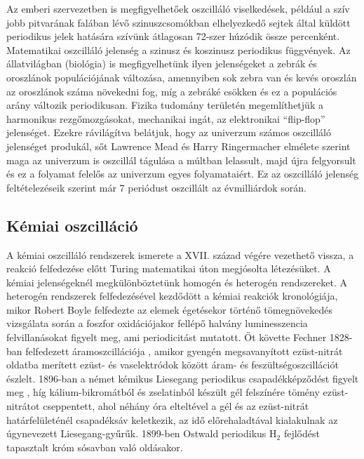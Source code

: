 Az emberi szervezetben is megfigyelhetőek oszcilláló viselkedések, például a szív jobb pitvarának falában lévő szinuszcsomókban elhelyezkedő sejtek által küldött periodikus jelek hatására  szívünk átlagosan 72-szer húzódik össze percenként. Matematikai oszcilláló jelenség a szinusz és koszinusz periodikus függvények. Az állatvilágban (biológia) is megfigyelhetünk ilyen jelenségeket a zebrák és oroszlánok populációjának változása, amennyiben sok zebra van és kevés oroszlán az oroszlánok száma növekedni fog, míg a zebráké csökken és ez a populációs arány változik periodikusan. Fizika tudomány területén megemlíthetjük a harmonikus rezgőmozgásokat, mechanikai ingát,  az elektronikai “flip-flop” jelenséget. Ezekre rávilágítva belátjuk, hogy az univerzum számos oszcilláló jelenséget produkál, sőt Lawrence Mead és Harry Ringermacher elmélete \cite{ringermacher2017strong}  szerint maga az univerzum is oszcillál tágulása a múltban lelassult, majd újra felgyorsult és ez a folyamat felelős az univerzum egyes folyamataiért. Ez az oszcilláló jelenség feltételezéseik szerint már 7 periódust oszcillált az évmilliárdok során.

\subsection{Kémiai oszcilláció}
A kémiai oszcilláló rendszerek ismerete a XVII. század végére vezethető vissza, a reakció felfedezése előtt Turing matematikai úton megjósolta létezésüket.\cite{turing1952chemical} A kémiai jelenségeknél megkülönböztetünk homogén és heterogén rendszereket. A heterogén rendszerek felfedezésével kezdődött a kémiai reakciók kronológiája, mikor Robert Boyle \cite{harvey1957history} felfedezte az elemek égetésekor történő tömegnövekedés vizsgálata során a foszfor oxidációjakor fellépő halvány luminesszencia felvillanásokat figyelt meg, ami periodicitást mutatott. Őt követte  Fechner 1828-ban felfedezett áramoszcillációja \cite{fechner1828schweigg}, amikor gyengén megsavanyított ezüst-nitrát oldatba merített ezüst- és vaselektródok között áram- és feszültségoszcillációt észlelt. 1896-ban a német kémikus Liesegang periodikus csapadékképződést figyelt meg \cite{liesegang1896ueber}, híg kálium-bikromátból és zselatinból készült gél felszínére tömény ezüst-nitrátot cseppentett, ahol néhány óra elteltével a gél és az ezüst-nitrát határfelületénél csapadéksáv keletkezik, az idő előrehaladtával kialakulnak az úgynevezett Liesegang-gyűrűk. 1899-ben Ostwald \cite{ostwald1899jacobus} periodikus H$_2$ fejlődést tapasztalt króm sósavban való oldásakor.


